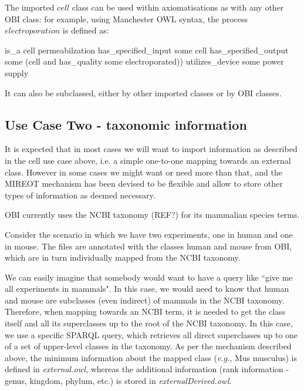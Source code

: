 \documentclass[a4paper,10pt,twocolumn]{article}
\begin{document}
The imported $cell$ class can be used within axiomatisations as with any other OBI class: for example, using Manchester OWL syntax, the process $electroporation$ is defined as:


\begin{footnotesize}
\begin{verbatimtab}
   is_a cell permeabilzation
   has_specified_input some cell
   has_specified_output some 
     (cell and has_quality some electroporated))
   utilizes_device some power supply
\end{verbatimtab}
\end{footnotesize}

It can also be subclassed, either by other imported classes or by OBI classes.

\subsection*{Use Case Two - taxonomic information}

It is expected that in most cases we will want to import information as described in the cell use case above, i.e. a simple one-to-one mapping towards an external class. However in some cases we might want or need more than that, and the MIREOT mechanism has been devised to be flexible and allow to store other types of information as deemed necessary.

OBI currently uses the NCBI taxonomy (REF?) for its mammalian species terms. 

Consider the scenario in which we have two experiments, one in human and one in mouse. The files are annotated with the classes human and mouse from OBI, which are in turn individually mapped from the NCBI taxonomy.

We can easily imagine that somebody would want to have a query like ``give me all experiments in mammals". In this case, we would need to know that human and mouse are subclasses (even indirect) of mammals in the NCBI taxonomy.
Therefore, when mapping towards an NCBI term, it is needed to get the class itself and all its superclasses up to the root of the NCBI taxonomy.
In this case, we use a specific SPARQL query, which retrieves all direct superclasses up to one of a set of upper-level classes in the taxonomy.%
As per the mechanism described above, the minimum information about the mapped class (\emph{e.g.}, Mus musculus) is defined in \emph{external.owl}, whereas the additional information (rank information - genus, kingdom, phylum, etc.) is stored in \emph{ externalDerived.owl}. 
\end{document}
